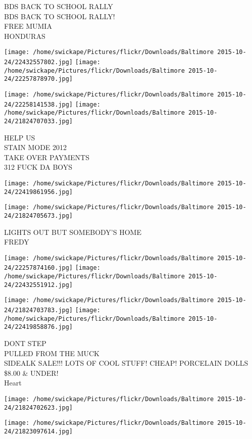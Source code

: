 \documentclass[10pt,letterpaper]{article}
\begin{document}
BDS BACK TO SCHOOL RALLY\\
BDS BACK TO SCHOOL RALLY!\\
FREE MUMIA\\
HONDURAS
\pagebreak

\texttt{[image: /home/swickape/Pictures/flickr/Downloads/Baltimore 2015-10-24/22432557802.jpg]}
\texttt{[image: /home/swickape/Pictures/flickr/Downloads/Baltimore 2015-10-24/22257878970.jpg]}

\texttt{[image: /home/swickape/Pictures/flickr/Downloads/Baltimore 2015-10-24/22258141538.jpg]}
\texttt{[image: /home/swickape/Pictures/flickr/Downloads/Baltimore 2015-10-24/21824707033.jpg]}

HELP US\\
STAIN MODE 2012\\
TAKE OVER PAYMENTS\\
312 FUCK DA BOYS
\pagebreak

\texttt{[image: /home/swickape/Pictures/flickr/Downloads/Baltimore 2015-10-24/22419861956.jpg]}

\vspace{0.25in}
\texttt{[image: /home/swickape/Pictures/flickr/Downloads/Baltimore 2015-10-24/21824705673.jpg]}

LIGHTS OUT BUT SOMEBODY'S HOME\\
FREDY
\pagebreak

\texttt{[image: /home/swickape/Pictures/flickr/Downloads/Baltimore 2015-10-24/22257874160.jpg]}
\texttt{[image: /home/swickape/Pictures/flickr/Downloads/Baltimore 2015-10-24/22432551912.jpg]}

\texttt{[image: /home/swickape/Pictures/flickr/Downloads/Baltimore 2015-10-24/21824703783.jpg]}
\texttt{[image: /home/swickape/Pictures/flickr/Downloads/Baltimore 2015-10-24/22419858876.jpg]}

DONT STEP\\
PULLED FROM THE MUCK\\
SIDEALK SALE!!!  LOTS OF COOL STUFF!  CHEAP!  PORCELAIN DOLLS \$8.00 \& UNDER!\\
Heart
\pagebreak

\texttt{[image: /home/swickape/Pictures/flickr/Downloads/Baltimore 2015-10-24/21824702623.jpg]}

\vspace{0.25in}
\texttt{[image: /home/swickape/Pictures/flickr/Downloads/Baltimore 2015-10-24/21823097614.jpg]}
\end{document}
